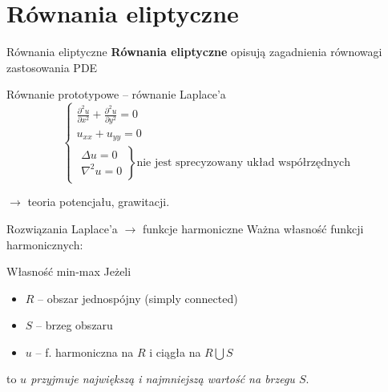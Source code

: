 \section{Równania eliptyczne}

\begin{frame}{Równania eliptyczne}
  \textbf{Równania eliptyczne} opisują zagadnienia równowagi zastosowania PDE

  \begin{block}{Równanie prototypowe -- równanie Laplace'a}
    $$\left\{ \begin{array}{l}
    \frac{{\partial}^2u}{{\partial}x^2} + \frac{{\partial}^2u}{{\partial}y^2} = 0 \\
    u_{xx} + u_{yy} = 0 \\
    \left. \begin{array}{l}
    \Delta u = 0 \\
    {\nabla}^2 u = 0
    \end{array} \right\} \text{nie jest sprecyzowany układ współrzędnych}
    \end{array} \right.$$
  \end{block}
  $\rightarrow$ teoria potencjału, grawitacji.
\end{frame}

\begin{frame}
  Rozwiązania Laplace'a $\rightarrow$ funkcje harmoniczne\newline
  Ważna własność funkcji harmonicznych:
  \begin{block}{Własność min-max}
    Jeżeli
    \begin{itemize}
      \item $R$ -- obszar jednospójny (simply connected)
      \item $S$ -- brzeg obszaru
      \item $u$ -- f. harmoniczna na $R$ i ciągła na $R \bigcup S$
    \end{itemize}

    to \textit{$u$ przyjmuje największą i najmniejszą wartość na brzegu $S$}.
  \end{block}
\end{frame}
